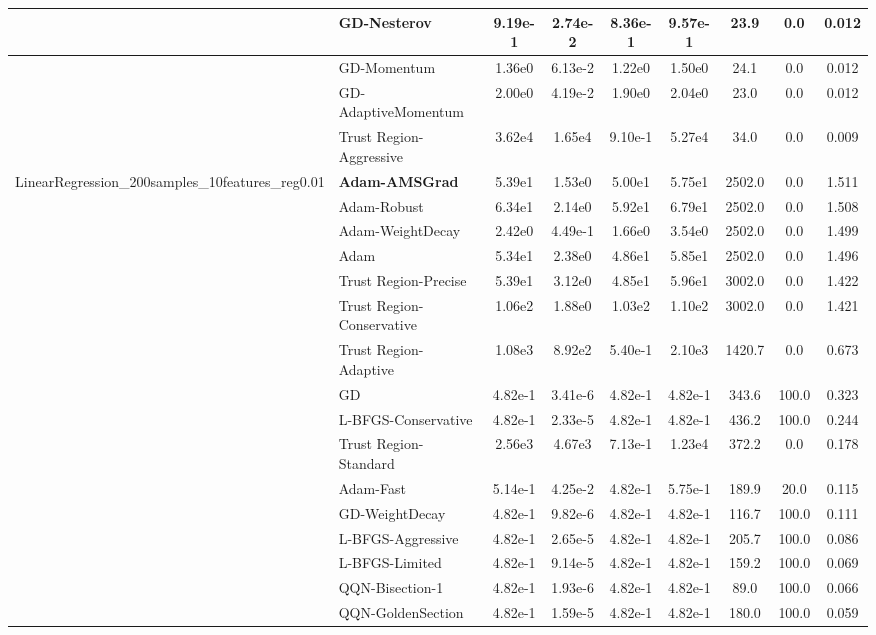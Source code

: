 \documentclass[10pt]{article}
\begin{document}
\begin{longtable}{|l|l|c|c|c|c|c|c|c|}
\hline
 & GD-Nesterov & 9.19e-1 & 2.74e-2 & 8.36e-1 & 9.57e-1 & 23.9 & 0.0 & 0.012 \\
\hline
 & GD-Momentum & 1.36e0 & 6.13e-2 & 1.22e0 & 1.50e0 & 24.1 & 0.0 & 0.012 \\
\hline
 & GD-AdaptiveMomentum & 2.00e0 & 4.19e-2 & 1.90e0 & 2.04e0 & 23.0 & 0.0 & 0.012 \\
\hline
 & Trust Region-Aggressive & 3.62e4 & 1.65e4 & 9.10e-1 & 5.27e4 & 34.0 & 0.0 & 0.009 \\
LinearRegression\_200samples\_10features\_reg0.01 & \textbf{Adam-AMSGrad} & 5.39e1 & 1.53e0 & 5.00e1 & 5.75e1 & 2502.0 & 0.0 & 1.511 \\
\hline
 & Adam-Robust & 6.34e1 & 2.14e0 & 5.92e1 & 6.79e1 & 2502.0 & 0.0 & 1.508 \\
\hline
 & Adam-WeightDecay & 2.42e0 & 4.49e-1 & 1.66e0 & 3.54e0 & 2502.0 & 0.0 & 1.499 \\
\hline
 & Adam & 5.34e1 & 2.38e0 & 4.86e1 & 5.85e1 & 2502.0 & 0.0 & 1.496 \\
\hline
 & Trust Region-Precise & 5.39e1 & 3.12e0 & 4.85e1 & 5.96e1 & 3002.0 & 0.0 & 1.422 \\
\hline
 & Trust Region-Conservative & 1.06e2 & 1.88e0 & 1.03e2 & 1.10e2 & 3002.0 & 0.0 & 1.421 \\
\hline
 & Trust Region-Adaptive & 1.08e3 & 8.92e2 & 5.40e-1 & 2.10e3 & 1420.7 & 0.0 & 0.673 \\
\hline
 & GD & 4.82e-1 & 3.41e-6 & 4.82e-1 & 4.82e-1 & 343.6 & 100.0 & 0.323 \\
\hline
 & L-BFGS-Conservative & 4.82e-1 & 2.33e-5 & 4.82e-1 & 4.82e-1 & 436.2 & 100.0 & 0.244 \\
\hline
 & Trust Region-Standard & 2.56e3 & 4.67e3 & 7.13e-1 & 1.23e4 & 372.2 & 0.0 & 0.178 \\
\hline
 & Adam-Fast & 5.14e-1 & 4.25e-2 & 4.82e-1 & 5.75e-1 & 189.9 & 20.0 & 0.115 \\
\hline
 & GD-WeightDecay & 4.82e-1 & 9.82e-6 & 4.82e-1 & 4.82e-1 & 116.7 & 100.0 & 0.111 \\
\hline
 & L-BFGS-Aggressive & 4.82e-1 & 2.65e-5 & 4.82e-1 & 4.82e-1 & 205.7 & 100.0 & 0.086 \\
\hline
 & L-BFGS-Limited & 4.82e-1 & 9.14e-5 & 4.82e-1 & 4.82e-1 & 159.2 & 100.0 & 0.069 \\
\hline
 & QQN-Bisection-1 & 4.82e-1 & 1.93e-6 & 4.82e-1 & 4.82e-1 & 89.0 & 100.0 & 0.066 \\
\hline
 & QQN-GoldenSection & 4.82e-1 & 1.59e-5 & 4.82e-1 & 4.82e-1 & 180.0 & 100.0 & 0.059 \\

\end{longtable}
\end{document}
